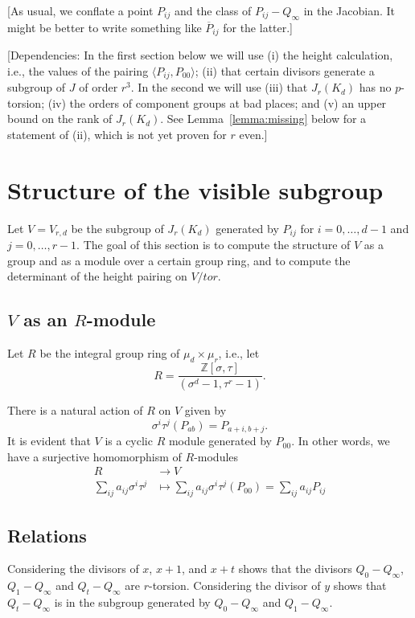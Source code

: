 \documentclass[reqno]{amsart}
\theoremstyle{definition}
\theoremstyle{remark}
\def\Z{\mathbb{Z}}
\begin{document}
[As usual, we conflate a point $P_{ij}$ and the class of
$P_{ij}-Q_\infty$ in the Jacobian.  It might be better to write
something like $\overline P_{ij}$ for the latter.]

[Dependencies: In the first section below we will use (i) the height
calculation, i.e., the values of the pairing $\langle
P_{ij},P_{00}\rangle$; (ii) that certain divisors generate a subgroup
of $J$ of order $r^3$.  In the second we will use (iii) that
$J_r(K_d)$ has no $p$-torsion; (iv) the orders of component groups at
bad places; and (v) an upper bound on the rank of $J_r(K_d)$.  See
Lemma~\ref{lemma:missing} below for a statement of (ii), which is not
yet proven for $r$ even.]


\section{Structure of the visible subgroup}
Let $V=V_{r,d}$ be the subgroup of $J_r(K_d)$ generated by $P_{ij}$
for $i=0,\dots,d-1$ and $j=0,\dots,r-1$.  The goal of this section is
to compute the structure of $V$ as a group and as a module over
a certain group ring, and to compute the determinant of the height
pairing on $V/tor$.

\subsection{$V$ as an $R$-module}
Let $R$ be the integral group ring of $\mu_d\times\mu_r$, i.e., let
$$R=\frac{\Z[\sigma,\tau]}{(\sigma^d-1,\tau^r-1)}.$$

There is a natural action of $R$ on $V$ given by 
$$\sigma^i\tau^j(P_{ab})=P_{a+i,b+j}.$$
It is evident that $V$ is a cyclic $R$ module generated by $P_{00}$.
In other words, we have a surjective homomorphism of $R$-modules
\begin{align*}
R&\to V\\
\sum_{ij}a_{ij}\sigma^i\tau^j&\mapsto
\sum_{ij}a_{ij}\sigma^i\tau^j(P_{00})
=\sum_{ij}a_{ij} P_{ij}
\end{align*}


\subsection{Relations}
Considering the divisors of $x$, $x+1$, and $x+t$ shows that the
divisors $Q_0-Q_\infty$, $Q_1-Q_\infty$ and $Q_t-Q_\infty$ are
$r$-torsion.  Considering the divisor of $y$ shows that $Q_t-Q_\infty$ is in
the subgroup generated by $Q_0-Q_\infty$ and $Q_1-Q_\infty$.  
\end{document}
